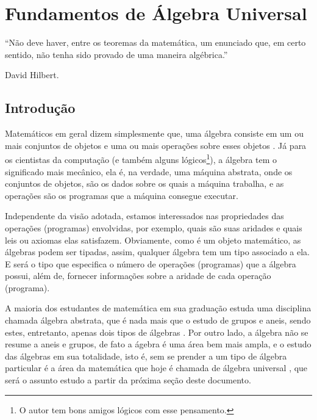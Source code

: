\chapter{Fundamentos de Álgebra Universal}

\epigraph{``Não deve haver, entre os teoremas da matemática, um enunciado que, em certo sentido, não tenha sido provado de uma maneira algébrica.''}{David Hilbert.}

\section{Introdução}


Matemáticos em geral dizem simplesmente que, uma álgebra consiste em um ou mais conjuntos de objetos e uma ou mais operações sobre esses objetos \cite{lang2008}. Já para os cientistas da computação (e também alguns lógicos\footnote{O autor tem bons amigos lógicos com esse pensamento.}), a álgebra tem o significado mais mecânico, ela é, na verdade, uma máquina abstrata, onde os conjuntos de objetos, são os dados sobre os quais a máquina trabalha, e as operações são os programas que a máquina consegue executar.

Independente da visão adotada, estamos interessados nas propriedades das operações (programas) envolvidas, por exemplo, quais são suas aridades e quais leis ou axiomas elas satisfazem. Obviamente, como é um objeto matemático, as álgebras podem ser tipadas, assim, qualquer álgebra tem um tipo associado a ela. E será o tipo que especifica o número de operações (programas) que a álgebra possui, além de, fornecer informações sobre a aridade de cada operação (programa). 

A maioria dos estudantes de matemática em sua graduação estuda uma disciplina chamada álgebra abstrata, que é nada mais que o estudo de grupos e aneis, sendo estes, entretanto, apenas dois tipos de álgebras \cite{stanley1981}. Por outro lado, a álgebra não se resume a aneis e grupos, de fato a ágebra é uma área bem mais ampla, e o estudo das álgebras em sua totalidade, isto é, sem se prender a um tipo de álgebra particular é a área da matemática que hoje é chamada de álgebra universal \cite{klaus2001, benja-Logica}, que será o assunto estudo a partir da próxima seção deste documento.


